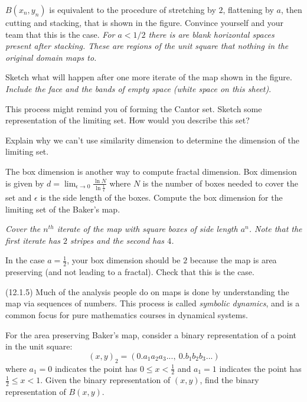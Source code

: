 \documentclass[12pt,letterpaper,noanswers]{exam}
\begin{document}
\begin{questions}
\begin{parts}
\item $B(x_n, y_n)$ is equivalent to the procedure of stretching by $2$, flattening by $a$, then cutting and stacking, that is shown in the figure.  Convince yourself and your team that this is the case.  \emph{For $a<1/2$ there is are blank horizontal spaces present after stacking.  These are regions of the unit square that nothing in the original domain maps to.}
\item Sketch what will happen after one more iterate of the map shown in the figure.  \emph{Include the face and the bands of empty space (white space on this sheet)}.
\item This process might remind you of forming the Cantor set.  Sketch some representation of the limiting set.  How would you describe this set?   

\item Explain why we can't use similarity dimension to determine the dimension of the limiting set.
\item The box dimension is another way to compute fractal dimension.  Box dimension is given by
$d = \lim_{\epsilon \rightarrow 0} \frac{\ln N}{\ln \frac{1}{\epsilon}}$ where $N$ is the number of boxes needed to cover the set and $\epsilon$
is the side length of the boxes.  Compute the box dimension for the limiting set of the Baker's map.

\emph{Cover the $n^{th}$ iterate of the map with square boxes
of side length $a^n$.  Note that the first iterate has $2$ stripes and the second has $4$.  }
\item In the case $a = \frac{1}{2}$, your box dimension should be $2$ because the map is area preserving (and not leading to a fractal).  Check that this is the case.

\end{parts}

\question
\begin{parts}
\item (12.1.5) Much of the analysis people do on maps is done by understanding the map via sequences of numbers.  This process is called \emph{symbolic dynamics}, and is a common focus for pure mathematics courses in dynamical systems.  

For the area preserving Baker's map, consider a binary representation of a point in the unit square:
\[ (x,y)_2 = (0.a_1 a_2 a_3 ...,\ 0.b_1b_2b_3...)\] where $a_1=0$ indicates the point has $0\leq x < \frac{1}{2}$ and $a_1 = 1$ indicates the point
has $\frac{1}{2} \leq x < 1$.  Given the binary representation of $(x,y)$, find the binary representation of $B(x,y)$.


\end{parts}
\end{questions}
\end{document}
